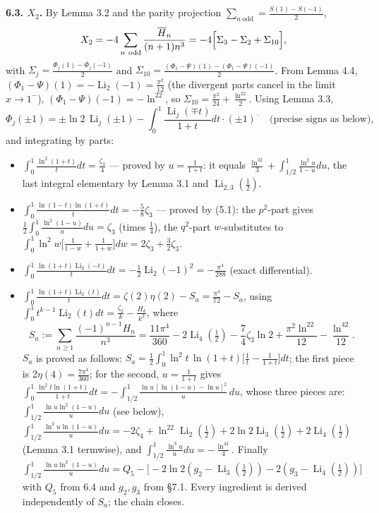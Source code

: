 \documentclass[11pt]{article}
\theoremstyle{remark}
\begin{document}
\textbf{6.3. $X_2$.} By Lemma 3.2 and the parity projection $\sum_{n\ \mathrm{odd}}=\frac{S(1)-S(-1)}2$,
\[
X_2=-4\sum_{n\ \mathrm{odd}}\frac{\overline H_n}{(n+1)n^3}
=-4\Bigl[\Sigma_3-\Sigma_2+\Sigma_{10}\Bigr],
\]
with $\Sigma_j=\frac{\Phi_j(1)-\Phi_j(-1)}2$ and $\Sigma_{10}=\frac{(\Phi_1-\Psi)(1)-(\Phi_1-\Psi)(-1)}{2}$. From Lemma 4.4, $(\Phi_1-\Psi)(1)=-\operatorname{Li}_2(-1)=\frac{\pi^2}{12}$ (the divergent parts cancel in the limit $x\to1^-$), $(\Phi_1-\Psi)(-1)=-\ln^22$, so $\Sigma_{10}=\frac{\pi^2}{24}+\frac{\ln^22}{2}$. Using Lemma 3.3,
\[
\Phi_j(\pm1)=\pm\ln2\,\operatorname{Li}_j(\pm1)-\int_0^1\frac{\operatorname{Li}_j(\mp t)}{1+t}dt\cdot(\pm1)^{\,\cdot}\quad\text{(precise signs as below)},
\]
and integrating by parts:
\begin{itemize}
\item $\int_0^1\frac{\ln^2(1+t)}{t}dt=\frac{\zeta_3}{4}$ --- proved by $u=\frac1{1+t}$: it equals $\frac{\ln^32}{3}+\int_{1/2}^1\frac{\ln^2u}{1-u}du$, the last integral elementary by Lemma 3.1 and $\operatorname{Li}_{2,3}(\tfrac12)$.
\item $\int_0^1\frac{\ln(1-t)\ln(1+t)}{t}dt=-\frac58\zeta_3$ --- proved by (5.1): the $p^2$-part gives $\tfrac12\int_0^1\frac{\ln^2(1-u)}{u}du=\zeta_3$ (times $\tfrac14$), the $q^2$-part $w$-substitutes to $\int_0^1\ln^2w\bigl[\frac1{1-w}+\frac1{1+w}\bigr]dw=2\zeta_3+\frac32\zeta_3$.
\item $\int_0^1\frac{\ln(1+t)\operatorname{Li}_2(-t)}{t}dt=-\frac12\operatorname{Li}_2(-1)^2=-\frac{\pi^4}{288}$ (exact differential).
\item $\int_0^1\frac{\ln(1+t)\operatorname{Li}_2(t)}{t}dt=\zeta(2)\eta(2)-S_a=\frac{\pi^4}{72}-S_a$, using $\int_0^1t^{k-1}\operatorname{Li}_2(t)dt=\frac{\zeta_2}{k}-\frac{H_k}{k^2}$, where
\[
S_a:=\sum_{n\ge1}\frac{(-1)^{n-1}H_n}{n^3}=\frac{11\pi^4}{360}-2\operatorname{Li}_4(\tfrac12)-\frac74\zeta_3\ln2+\frac{\pi^2\ln^22}{12}-\frac{\ln^42}{12}.
\]
$S_a$ is proved as follows: $S_a=\frac12\int_0^1\ln^2t\,\ln(1+t)\bigl[\frac1t-\frac1{1+t}\bigr]dt$; the first piece is $2\eta(4)=\frac{7\pi^4}{360}$; for the second, $u=\frac1{1+t}$ gives
$\int_0^1\frac{\ln^2t\ln(1+t)}{1+t}dt=-\int_{1/2}^1\frac{\ln u\,[\ln(1-u)-\ln u]^2}{u}\,du$, whose three pieces are: $\int_{1/2}^1\frac{\ln u\ln^2(1-u)}{u}du$ (see below), $\int_{1/2}^1\frac{\ln^2u\ln(1-u)}{u}du=-2\zeta_4+\ln^22\operatorname{Li}_2(\tfrac12)+2\ln2\operatorname{Li}_3(\tfrac12)+2\operatorname{Li}_4(\tfrac12)$ (Lemma 3.1 termwise), and $\int_{1/2}^1\frac{\ln^3u}{u}du=-\frac{\ln^42}{4}$. Finally $\int_{1/2}^1\frac{\ln u\ln^2(1-u)}{u}du = Q_5-\bigl[-2\ln2(g_2-\operatorname{Li}_3(\tfrac12))-2(g_3-\operatorname{Li}_4(\tfrac12))\bigr]$ with $Q_5$ from 6.4 and $g_2,g_3$ from \S7.1. Every ingredient is derived independently of $S_a$; the chain closes.
\end{itemize}
\end{document}
